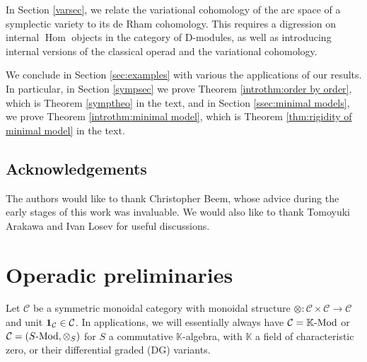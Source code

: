 \documentclass[11pt]{amsart}
\numberwithin{equation}{section}
\theoremstyle{definition}
\newcommand{\bb}{\mathbb}
\newcommand{\mc}{\mathcal}
\DeclareMathOperator{\Hom}{Hom}
\DeclareMathOperator{\Vect}{Vect}
\newcommand{\Mod}{{\textup{-Mod}}}
\newcommand{\K}{{\bb K}}
\newcommand{\ik}{{\bb K}}
\newcommand{\CC}{{\textup{CC}}}
\newcommand{\0}{{\textbf{0}}}
\def\CC{{\mc C}}
\newcommand{\tensor}[1]{\underset{#1}{\otimes}}
\begin{document}
In Section \ref{varsec}, we relate the variational cohomology of the arc space of a symplectic variety to its de Rham cohomology. This requires a digression on internal $\Hom$ objects in the category of D-modules, as well as introducing internal versions of the classical operad and the variational cohomology.

We conclude in Section \ref{sec:examples} with various the applications of our results. In particular, in Section \ref{sympsec} we prove Theorem \ref{introthm:order by order}, which is Theorem \ref{symptheo} in the text, and in Section \ref{ssec:minimal models}, we prove Theorem \ref{introthm:minimal model}, which is Theorem \ref{thm:rigidity of minimal model} in the text.

\subsection*{Acknowledgements}

The authors would like to thank Christopher Beem, whose advice during the early stages of this work was invaluable. We would also like to thank Tomoyuki Arakawa and Ivan Losev for useful discussions.







\section{Operadic preliminaries}\label{sec:operad prelim}

Let $\mc C$ be a symmetric monoidal category with monoidal structure $\otimes:\mc C\times \mc C\to \mc C$ and unit ${\bf 1}_\CC\in \CC$. In applications, we will essentially always have $\mc C=\K\Mod$ or $\mc C = (S\Mod, \otimes_S)$ for $S$ a commutative $\K$-algebra, with $\K$ a field of characteristic zero, or their differential graded (DG) variants.
\end{document}
